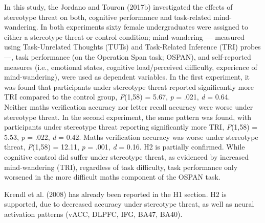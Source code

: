 \documentclass[
  stu, a4paper,floatsintext]{apa7}
\begin{document}
In this study, the Jordano and Touron (2017b) investigated the effects of stereotype threat on both, cognitive performance and task-related mind-wandering.
In both experiments sixty female undergraduates were assigned to either a stereotype threat or control condition; mind-wandering --- measured using Task-Unrelated Thoughts (TUTs) and Task-Related Inference (TRI) probes ---, task performance (on the Operation Span task; OSPAN), and self-reported measures (i.e., emotional states, cognitive load/perceived difficulty, experience of mind-wandering), were used as dependent variables.
In the first experiment, it was found that participants under stereotype threat reported significantly more TRI compared to the control group, \emph{F}(1,58) = 5.67, \emph{p} = .021, \emph{d} = 0.64.\\
Neither maths verification accuracy nor letter recall accuracy were worse under stereotype threat.
In the second experiment, the same pattern was found, with participants under stereotype threat reporting significantly more TRI, \emph{F}(1,58) = 5.53, \emph{p} = .022, \emph{d} = 0.42.
Maths verification accuracy was worse under stereotype threat, \emph{F}(1,58) = 12.11, \emph{p} = .001, \emph{d} = 0.16.
H2 is partially confirmed. While cognitive control did suffer under stereotype threat, as evidenced by increased mind-wandering (TRI), regardless of task difficulty, task performance only worsened in the more difficult maths component of the OSPAN task.

Krendl et al. (2008) has already been reported in the H1 section.
H2 is supported, due to decreased accuracy under stereotype threat, as well as neural activation patterns (vACC, DLPFC, IFG, BA47, BA40).
\end{document}
